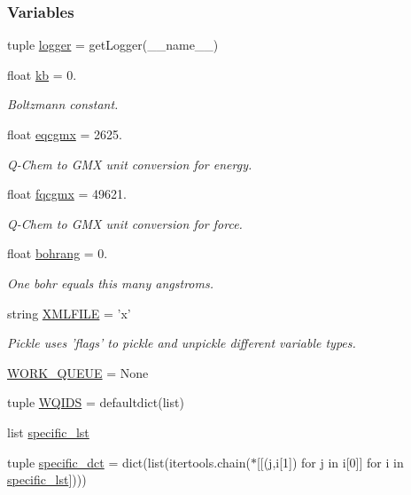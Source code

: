 \subsubsection*{\-Variables}
\begin{DoxyCompactItemize}
\item 
tuple \hyperlink{namespaceforcebalance_1_1nifty_a94fc8d9a0375d86ee16bfe16c896d74c}{logger} = get\-Logger(\-\_\-\-\_\-name\-\_\-\-\_\-)
\item 
float \hyperlink{namespaceforcebalance_1_1nifty_aace36d3e1ed8cd2ead67d53ec177063f}{kb} = 0.
\begin{DoxyCompactList}\small\item\em \-Boltzmann constant. \end{DoxyCompactList}\item 
float \hyperlink{namespaceforcebalance_1_1nifty_a2b5a159b5e297e92699a10b05fa8911f}{eqcgmx} = 2625.
\begin{DoxyCompactList}\small\item\em \-Q-\/\-Chem to \-G\-M\-X unit conversion for energy. \end{DoxyCompactList}\item 
float \hyperlink{namespaceforcebalance_1_1nifty_a7ad933fe53e048142852569b9a288f2e}{fqcgmx} = 49621.
\begin{DoxyCompactList}\small\item\em \-Q-\/\-Chem to \-G\-M\-X unit conversion for force. \end{DoxyCompactList}\item 
float \hyperlink{namespaceforcebalance_1_1nifty_a9d8921e29d14572a15a6bd1755d240d4}{bohrang} = 0.
\begin{DoxyCompactList}\small\item\em \-One bohr equals this many angstroms. \end{DoxyCompactList}\item 
string \hyperlink{namespaceforcebalance_1_1nifty_a89b76b7b16a8e2533c6599fa9ff8cff6}{\-X\-M\-L\-F\-I\-L\-E} = 'x'
\begin{DoxyCompactList}\small\item\em \-Pickle uses 'flags' to pickle and unpickle different variable types. \end{DoxyCompactList}\item 
\hyperlink{namespaceforcebalance_1_1nifty_abceb325c49650f2b4e443fc65adb12c1}{\-W\-O\-R\-K\-\_\-\-Q\-U\-E\-U\-E} = \-None
\item 
tuple \hyperlink{namespaceforcebalance_1_1nifty_a1410db09cf3d0507bcf758d46e83c711}{\-W\-Q\-I\-D\-S} = defaultdict(list)
\item 
list \hyperlink{namespaceforcebalance_1_1nifty_a451beef98f339cc46bf19b8b4b9dd755}{specific\-\_\-lst}
\item 
tuple \hyperlink{namespaceforcebalance_1_1nifty_a41091c8b7861352d9cba164b15d0d022}{specific\-\_\-dct} = dict(list(itertools.\-chain($\ast$\mbox{[}\mbox{[}(j,i\mbox{[}1\mbox{]}) for j in i\mbox{[}0\mbox{]}\mbox{]} for i in \hyperlink{namespaceforcebalance_1_1nifty_a451beef98f339cc46bf19b8b4b9dd755}{specific\-\_\-lst}\mbox{]})))
\end{DoxyCompactItemize}


